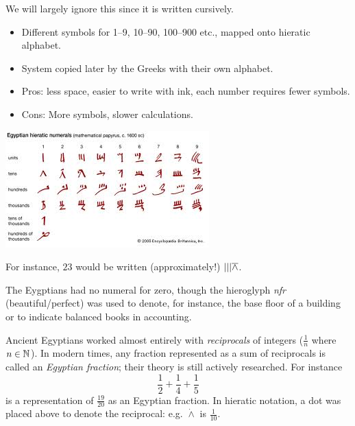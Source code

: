 \begin{minipage}[t]{0.5\linewidth}\vspace{0pt}

We will largely ignore this since it is written cursively.
\begin{itemize}\itemsep0pt
  \item Different symbols for 1--9, 10--90, 100--900 etc., mapped onto hieratic alphabet.
  \item System copied later by the Greeks with their own alphabet.
  \item Pros: less space, easier to write with ink, each number requires fewer symbols.
	\item Cons: More symbols, slower calculations.
\end{itemize}
\end{minipage}\hfill\begin{minipage}[t]{0.49\linewidth}\vspace{0pt}
\flushright\includegraphics[scale=0.75]{hieratic.jpg}
\end{minipage}\medbreak

For instance, $23$ would be written (approximately!) $|||\overline{\wedge}$.\smallbreak

The Eygptians had no numeral for zero, though the hieroglyph \emph{nfr} (beautiful/perfect) was used to denote, for instance, the base floor of a building or to indicate balanced books in accounting.\vspace{-5pt}


Ancient Egyptians worked almost entirely with \emph{reciprocals} of integers ($\frac 1n$ where $n\in\mathbb{N}$). In modern times, any fraction represented as a sum of reciprocals is called an \emph{Egyptian fraction}; their theory is still actively researched. For instance
\[\frac 12+\frac 14+\frac 15\]
is a representation of $\frac{19}{20}$ as an Egyptian fraction.\smallbreak
In hieratic notation, a dot was placed above to denote the reciprocal: e.g.{} $\dot{\wedge}$ is $\frac 1{10}$.\par

